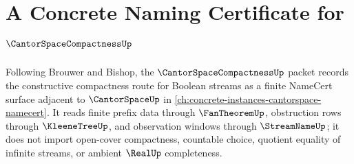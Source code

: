 \chapter{A Concrete Naming Certificate for $\CantorSpaceCompactnessUp$}
\label{ch:concrete-instances-cantor-space-compactness-namecert}

Following Brouwer and Bishop, the $\CantorSpaceCompactnessUp$ packet records the constructive compactness route for Boolean streams as a finite NameCert surface adjacent to $\CantorSpaceUp$ in \autoref{ch:concrete-instances-cantorspace-namecert}. It reads finite prefix data through $\FanTheoremUp$, obstruction rows through $\KleeneTreeUp$, and observation windows through $\StreamNameUp$; it does not import open-cover compactness, countable choice, quotient equality of infinite streams, or ambient $\RealUp$ completeness.

